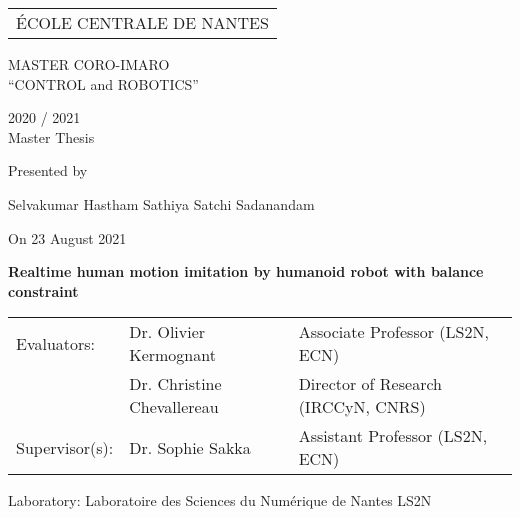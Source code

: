 \thispagestyle{empty}

\def\lskip{\vspace{0.5cm}}

\begin{center}
	\begin{tabular}{c}
		ÉCOLE CENTRALE DE NANTES
		\end{tabular}
\end{center}


\vspace{2cm}

\begin{center} \large\sc MASTER CORO-IMARO\\ \normalsize{``CONTROL and ROBOTICS''} \end{center}



\begin{center}
	2020 / 2021\\
	\lskip
	Master Thesis %
	\lskip
	
	Presented by \lskip 
	
	Selvakumar Hastham Sathiya Satchi Sadanandam \lskip
	
	On 23 August 2021 \lskip\lskip
	
	{\Large \textbf{Realtime human motion imitation by humanoid robot with balance constraint}}
	
	\vfill

		
	\end{center}
	


\begin{tabular}{p{3cm}p{5cm}p{7cm} }
 Evaluators: & Dr. Olivier Kermognant & Associate Professor (LS2N, ECN) \\
	      & Dr. Christine Chevallereau & Director of Research (IRCCyN, CNRS) \\ 
  Supervisor(s):  & Dr. Sophie Sakka & Assistant Professor (LS2N, ECN) \\
\end{tabular}

\lskip

\begin{flushleft}
 Laboratory: Laboratoire des Sciences du Numérique de Nantes LS2N
\end{flushleft}

\newpage
\thispagestyle{empty}
\null
\newpage
\addtocounter{page}{-1}
\pagestyle{fancy}
